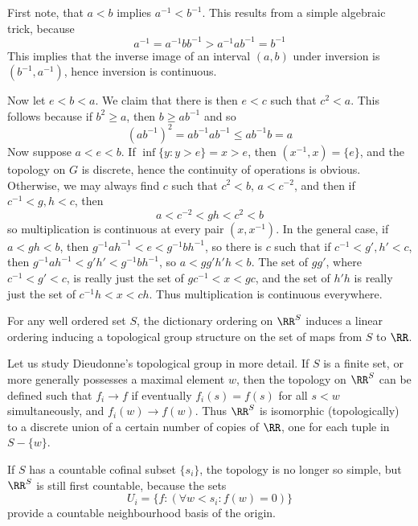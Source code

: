 First note, that $a < b$ implies $a^{-1} < b^{-1}$. This results from a simple algebraic trick, because
%
\[  a^{-1} = a^{-1} b b^{-1} > a^{-1} a b^{-1} = b^{-1} \]
%
This implies that the inverse image of an interval $(a,b)$ under inversion is $(b^{-1}, a^{-1})$, hence inversion is continuous.

Now let $e < b < a$. We claim that there is then $e < c$ such that $c^2 < a$. This follows because if $b^2 \geq a$, then $b \geq ab^{-1}$ and so
%
\[ (ab^{-1})^2 = ab^{-1}ab^{-1} \leq ab^{-1}b = a \]
%
Now suppose $a < e < b$. If $\inf \{ y : y > e \} = x > e$, then $(x^{-1}, x) = \{ e \}$, and the topology on $G$ is discrete, hence the continuity of operations is obvious. Otherwise, we may always find $c$ such that $c^2 < b$, $a < c^{-2}$, and then if $c^{-1} < g,h < c$, then
%
\[ a < c^{-2} < gh < c^2 < b \]
%
so multiplication is continuous at every pair $(x,x^{-1})$. In the general case, if $a < gh < b$, then $g^{-1}ah^{-1} < e < g^{-1}bh^{-1}$, so there is $c$ such that if $c^{-1} < g',h' < c$, then $g^{-1}ah^{-1} < g'h' < g^{-1}bh^{-1}$, so $a < gg'h'h < b$. The set of $gg'$, where $c^{-1} < g' < c$, is really just the set of $gc^{-1} < x < gc$, and the set of $h'h$ is really just the set of $c^{-1}h < x < ch$. Thus multiplication is continuous everywhere.

\begin{example}[Dieudonne]
    For any well ordered set $S$, the dictionary ordering on $\RR^S$ induces a linear ordering inducing a topological group structure on the set of maps from $S$ to $\RR$.
\end{example}

Let us study Dieudonne's topological group in more detail. If $S$ is a finite set, or more generally possesses a maximal element $w$, then the topology on $\RR^S$ can be defined such that $f_i \to f$ if eventually $f_i(s) = f(s)$ for all $s < w$ simultaneously, and $f_i(w) \to f(w)$. Thus $\RR^S$ is isomorphic (topologically) to a discrete union of a certain number of copies of $\RR$, one for each tuple in $S - \{ w \}$.

If $S$ has a countable cofinal subset $\{ s_i \}$, the topology is no longer so simple, but $\RR^S$ is still first countable, because the sets
%
\[ U_i = \{ f : (\forall w < s_i: f(w) = 0) \} \]
%
provide a countable neighbourhood basis of the origin.

